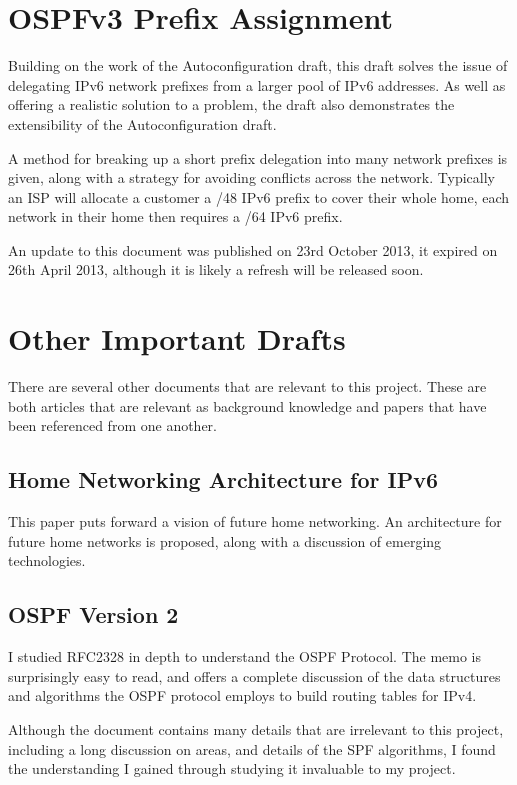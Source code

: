 \documentclass[12pt,a4paper,twoside]{report}
\begin{document}
\section{OSPFv3 Prefix Assignment}
Building on the work of the Autoconfiguration draft, this
draft\cite{draft-arkko-homenet-prefix-assignment-03} solves the issue of
delegating IPv6 network prefixes from a larger pool of IPv6 addresses. As well
as offering a realistic solution to a problem, the draft also demonstrates the
extensibility of the Autoconfiguration draft. 

A method for breaking up a short prefix delegation into many network prefixes
is given, along with a strategy for avoiding conflicts across the network.
Typically an ISP will allocate a customer a /48 IPv6 prefix to cover their
whole home, each network in their home then requires a /64 IPv6 prefix.

An update to this document was published on 23rd October 2013, it expired on
26th April 2013, although it is likely a refresh will be released soon.

\section{Other Important Drafts}
There are several other documents that are relevant to this project. These are
both articles that are relevant as background knowledge and papers that have
been referenced from one another.

\subsection{Home Networking Architecture for IPv6} 
This paper\cite{draft-ietf-homenet-arch-07} puts forward a vision of future
home networking. An architecture for future home networks is proposed, along
with a discussion of emerging technologies. 

\subsection{OSPF Version 2}
I studied RFC2328\cite{rfc2328} in depth to understand the OSPF Protocol. The
memo is surprisingly easy to read, and offers a complete discussion of the data
structures and algorithms the OSPF protocol employs to build routing tables for
IPv4. 

Although the document contains many details that are irrelevant to this project, 
including a long discussion on areas, and details of the SPF algorithms, I found
the understanding I gained through studying it invaluable to my project.
\end{document}
